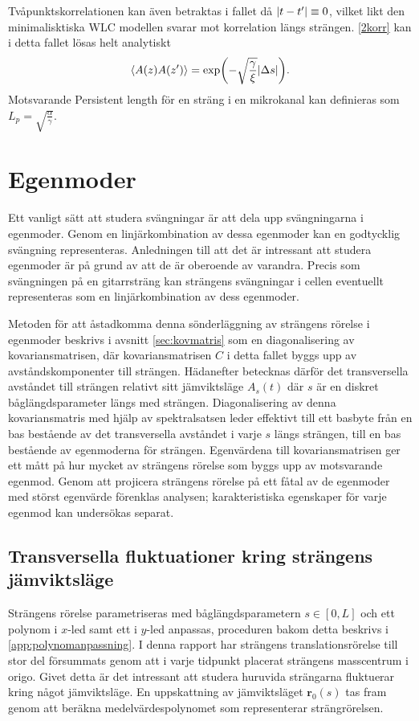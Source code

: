 Tvåpunktskorrelationen kan även betraktas i fallet då $\abs{t-t'}\equiv 0$, vilket likt den minimalisktiska WLC modellen svarar mot korrelation längs strängen. \eqref{2korr} kan i detta fallet lösas helt analytiskt
\begin{equation}
\ev{A(z)A(z')}=\exp(-\sqrt{\frac{\gamma}{\xi}}\abs{\Delta s}).
\end{equation}
Motsvarande Persistent length för en sträng i en mikrokanal kan definieras som $L_{p}=\sqrt{\frac{\alpha}{\gamma}}$.



\section{Egenmoder}
Ett vanligt sätt att studera svängningar är att dela upp svängningarna i egenmoder. Genom en linjärkombination av dessa egenmoder kan en godtycklig svängning representeras. Anledningen till att det är intressant att studera egenmoder är på grund av att de är oberoende av varandra. Precis som  svängningen på en gitarrsträng kan strängens svängningar i cellen eventuellt representeras som en linjärkombination av dess egenmoder. 



Metoden för att åstadkomma denna sönderläggning av strängens rörelse i egenmoder beskrivs i avsnitt \ref{sec:kovmatris} som en diagonalisering av kovariansmatrisen, där kovariansmatrisen $C$ i detta fallet byggs upp av avståndskomponenter till strängen. Hädanefter betecknas därför det transversella avståndet till strängen relativt sitt jämviktsläge $A_s(t)$ där $s$ är en diskret båglängdsparameter längs med strängen. Diagonalisering av denna kovariansmatris med hjälp av spektralsatsen leder effektivt till ett basbyte från en bas bestående av det transversella avståndet i varje $s$ längs strängen, till en bas bestående av egenmoderna för strängen. Egenvärdena till kovariansmatrisen ger ett mått på hur mycket av strängens rörelse som byggs upp av motsvarande egenmod. Genom att projicera strängens rörelse på ett fåtal av de egenmoder med störst egenvärde förenklas analysen\cite{Shlens_PCA2014}; karakteristiska egenskaper för varje egenmod kan undersökas separat. 

\subsection{Transversella fluktuationer kring strängens jämviktsläge}
Strängens rörelse parametriseras med båglängdsparametern $s\in[0,L]$ och ett polynom i $x$-led samt ett i $y$-led anpassas, proceduren bakom detta beskrivs i \ref{app:polynomanpassning}. I denna rapport har strängens translationsrörelse till stor del försummats genom att i varje tidpunkt placerat strängens masscentrum i origo. Givet detta är det intressant att studera huruvida strängarna fluktuerar kring något jämviktsläge. En uppskattning av jämviktsläget $\mathbf{r}_0(s)$ tas fram genom att beräkna medelvärdespolynomet som representerar strängrörelsen. 

